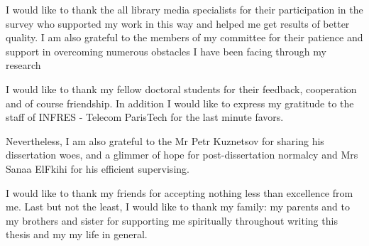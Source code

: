 \begin{acknowledgements}
I would like to thank the all library media specialists for their participation in the survey who supported my work in this way and helped me get results of better quality. I am also grateful to the members of my committee for their patience and support in overcoming numerous obstacles I have been facing through my research

I would like to thank my fellow doctoral students for their feedback, cooperation and of course friendship. In addition I would like to express my gratitude to the staff of INFRES - Telecom ParisTech for  the last minute favors.

Nevertheless, I am also grateful to the Mr Petr Kuznetsov for sharing his dissertation woes, and a glimmer of hope for post-dissertation normalcy and Mrs Sanaa ElFkihi for his efficient supervising.

I would like to thank my friends for accepting nothing less than excellence from me. Last but not the least, I would like to thank my family: my parents and to my brothers and sister for supporting me spiritually throughout writing this thesis and my my life in general.
\end{acknowledgements}